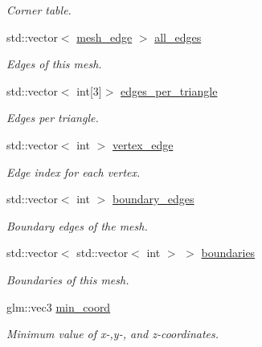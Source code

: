 \begin{DoxyCompactItemize}
\begin{DoxyCompactList}\small\item\em Corner table. \end{DoxyCompactList}\item 
std\+::vector$<$ \hyperlink{classgeoproc_1_1mesh__edge}{mesh\+\_\+edge} $>$ \hyperlink{classgeoproc_1_1TriangleMesh_ab10f052ad932cd78056a55b58ddd475c}{all\+\_\+edges}
\begin{DoxyCompactList}\small\item\em Edges of this mesh. \end{DoxyCompactList}\item 
std\+::vector$<$ int\mbox{[}3\mbox{]}$>$ \hyperlink{classgeoproc_1_1TriangleMesh_ad72cdd2358e815a09c07176730b4e0a5}{edges\+\_\+per\+\_\+triangle}
\begin{DoxyCompactList}\small\item\em Edges per triangle. \end{DoxyCompactList}\item 
std\+::vector$<$ int $>$ \hyperlink{classgeoproc_1_1TriangleMesh_abbc25699f67776fc99c909124b0c584a}{vertex\+\_\+edge}
\begin{DoxyCompactList}\small\item\em Edge index for each vertex. \end{DoxyCompactList}\item 
std\+::vector$<$ int $>$ \hyperlink{classgeoproc_1_1TriangleMesh_a142a764ddf07b98c7efcd596d88c3f87}{boundary\+\_\+edges}
\begin{DoxyCompactList}\small\item\em Boundary edges of the mesh. \end{DoxyCompactList}\item 
std\+::vector$<$ std\+::vector$<$ int $>$ $>$ \hyperlink{classgeoproc_1_1TriangleMesh_a57162eac37831c87786a8dab8331d72f}{boundaries}
\begin{DoxyCompactList}\small\item\em Boundaries of this mesh. \end{DoxyCompactList}\item 
\mbox{\label{classgeoproc_1_1TriangleMesh_aab5e7d8baf6f6cd7b5655b4c89f79e00}} 
glm\+::vec3 \hyperlink{classgeoproc_1_1TriangleMesh_aab5e7d8baf6f6cd7b5655b4c89f79e00}{min\+\_\+coord}
\begin{DoxyCompactList}\small\item\em Minimum value of x-\/,y-\/, and z-\/coordinates. \end{DoxyCompactList}\item 

\end{DoxyCompactItemize}
